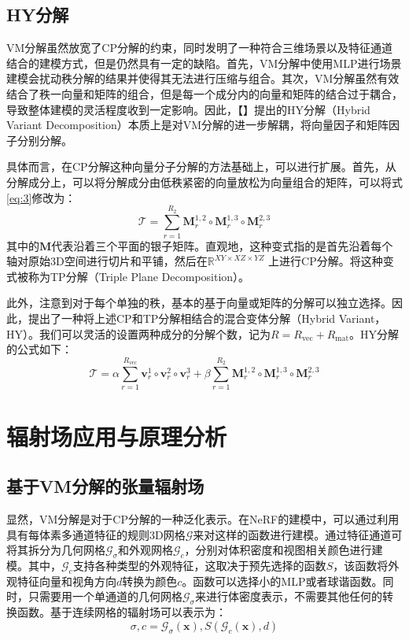 \documentclass[10pt,twocolumn,letterpaper]{article}
\begin{document}
\subsection{HY分解}
\label{sec:hy}
VM分解虽然放宽了CP分解的约束，同时发明了一种符合三维场景以及特征通道结合的建模方式，但是仍然具有一定的缺陷。首先，VM分解中使用MLP进行场景建模会扰动秩分解的结果并使得其无法进行压缩与组合。其次，VM分解虽然有效结合了秩一向量和矩阵的组合，但是每一个成分内的向量和矩阵的结合过于耦合，导致整体建模的灵活程度收到一定影响。因此，【】提出的HY分解（Hybrid Variant Decomposition）本质上是对VM分解的进一步解耦，将向量因子和矩阵因子分别分解。

具体而言，在CP分解这种向量分子分解的方法基础上，可以进行扩展。首先，从分解成分上，可以将分解成分由低秩紧密的向量放松为向量组合的矩阵，可以将式\ref{eq:3}修改为：
\begin{equation}
  \mathcal{T}=\sum_{r=1}^{R_{2}} \mathbf{M}_{r}^{1,2} \circ \mathbf{M}_{r}^{1,3} \circ \mathbf{M}_{r}^{2,3}
\end{equation}
\label{eq:5}
其中的$\mathbf M$代表沿着三个平面的银子矩阵。直观地，这种变式指的是首先沿着每个轴对原始3D空间进行切片和平铺，然后在$\mathbb R^{XY\times XZ\times YZ}$ 上进行CP分解。将这种变式被称为TP分解（Triple Plane Decomposition）。

此外，注意到对于每个单独的秩，基本的基于向量或矩阵的分解可以独立选择。因此，提出了一种将上述CP和TP分解相结合的混合变体分解（Hybrid Variant，HY）。我们可以灵活的设置两种成分的分解个数，记为$R=R_{\text{vec}}+R_{\text{mat}}$。HY分解的公式如下：
\begin{equation}
  \mathcal{T}=\alpha\sum_{r=1}^{R_{vec}} \mathbf{v}_{r}^{1} \circ \mathbf{v}_{r}^{2} \circ \mathbf{v}_{r}^{3}+\beta\sum_{r=1}^{R_{2}} \mathbf{M}_{r}^{1,2} \circ \mathbf{M}_{r}^{1,3} \circ \mathbf{M}_{r}^{2,3}
\end{equation}
\label{eq:6}

\section{辐射场应用与原理分析}
\label{sec:analysis}

\subsection{基于VM分解的张量辐射场}
显然，VM分解是对于CP分解的一种泛化表示。在NeRF的建模中，可以通过利用具有每体素多通道特征的规则3D网格$\mathcal G$来对这样的函数进行建模。通过特征通道可将其拆分为几何网格$\mathcal G_σ$和外观网格$\mathcal G_c$，分别对体积密度和视图相关颜色进行建模。其中，$\mathcal G_c$支持各种类型的外观特征，这取决于预先选择的函数$S$，该函数将外观特征向量和视角方向$d$转换为颜色$c$。函数可以选择小的MLP或者球谐函数。同时，只需要用一个单通道的几何网格$\mathcal G_\sigma$来进行体密度表示，不需要其他任何的转换函数。基于连续网格的辐射场可以表示为：
\begin{equation}
  \sigma, c=\mathcal{G}_{\sigma}(\mathbf{x}), S\left(\mathcal{G}_{c}(\mathbf{x}), d\right)
\end{equation}
\label{eq:n}
\end{document}
